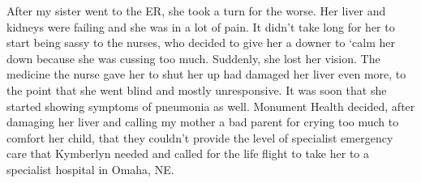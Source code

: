 \documentclass[12pt, letterpaper]{article}
\begin{document}
\begin{flushleft}
After my sister went to the ER, she took a turn for the worse.
Her liver and kidneys were failing and she was in a lot of pain.
It didn't take long for her to start being sassy to the nurses, 
who decided to give her a downer to `calm her down
because she was cussing too much.
Suddenly, she lost her vision.
The medicine the nurse gave her to shut her up had damaged her liver even more,
to the point that she went blind and mostly unresponsive.
It was soon that she started showing symptoms of pneumonia as well.
Monument Health decided, after damaging her liver and calling my mother
a bad parent for crying too much to comfort her child, that they couldn't 
provide the level of specialist emergency care that Kymberlyn needed and 
called for the life flight to take her to a specialist hospital in Omaha, NE\@.
\vspace{5mm}



\end{flushleft}
\end{document}
